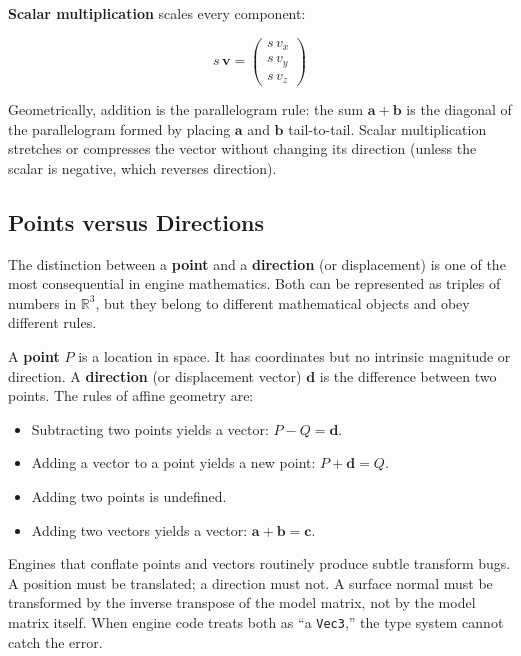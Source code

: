 \documentclass[
  11pt,
  letterpaper,
  DIV=11,
  numbers=noendperiod,
  twoside,
  open=right]{scrreprt}
\providecommand{\tightlist}{%
  \setlength{\itemsep}{0pt}\setlength{\parskip}{0pt}}
\begin{document}
\textbf{Scalar multiplication} scales every component:

\[
s \, \mathbf{v} = \begin{pmatrix} s \, v_x \\ s \, v_y \\ s \, v_z \end{pmatrix}
\]

Geometrically, addition is the parallelogram rule: the sum
\(\mathbf{a} + \mathbf{b}\) is the diagonal of the parallelogram formed
by placing \(\mathbf{a}\) and \(\mathbf{b}\) tail-to-tail. Scalar
multiplication stretches or compresses the vector without changing its
direction (unless the scalar is negative, which reverses direction).

\subsection{Points versus Directions}\label{points-versus-directions}

The distinction between a \textbf{point} and a \textbf{direction} (or
displacement) is one of the most consequential in engine mathematics.
Both can be represented as triples of numbers in \(\mathbb{R}^3\), but
they belong to different mathematical objects and obey different rules.

A \textbf{point} \(P\) is a location in space. It has coordinates but no
intrinsic magnitude or direction. A \textbf{direction} (or displacement
vector) \(\mathbf{d}\) is the difference between two points. The rules
of affine geometry are:

\begin{itemize}
\tightlist
\item
  Subtracting two points yields a vector: \(P - Q = \mathbf{d}\).
\item
  Adding a vector to a point yields a new point: \(P + \mathbf{d} = Q\).
\item
  Adding two points is undefined.
\item
  Adding two vectors yields a vector:
  \(\mathbf{a} + \mathbf{b} = \mathbf{c}\).
\end{itemize}

Engines that conflate points and vectors routinely produce subtle
transform bugs. A position must be translated; a direction must not. A
surface normal must be transformed by the inverse transpose of the model
matrix, not by the model matrix itself. When engine code treats both as
``a \texttt{Vec3},'' the type system cannot catch the error.
\end{document}
